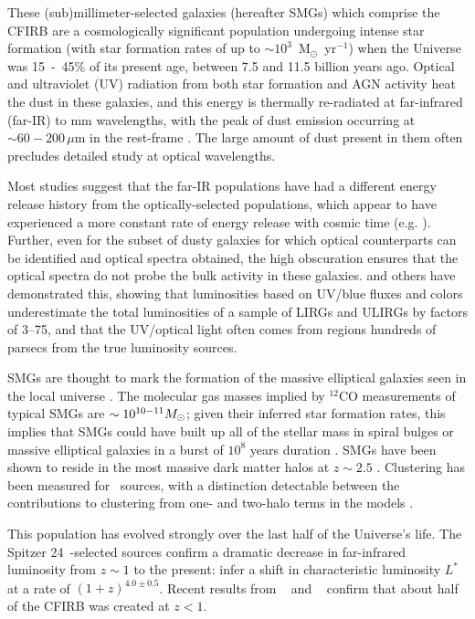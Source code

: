 These (sub)millimeter-selected galaxies (hereafter SMGs) which
comprise the CFIRB are a cosmologically significant population
undergoing intense star formation (with star formation rates of up to
$\sim10^3$~M$_{\odot}$~yr$^{-1}$) when the Universe was \mbox{15 -
45\%} of its present age, between 7.5 and 11.5 billion years
ago. Optical and ultraviolet (UV) radiation from both star formation
and AGN activity heat the dust in these galaxies, and this energy is
thermally re-radiated at far-infrared (far-IR) to mm wavelengths, with
the peak of dust emission occurring at $\sim60-200\,\mu$m in the
rest-frame \citep{soifer91}.  The large amount of dust present in them
often precludes detailed study at optical wavelengths.

Most studies suggest that the far-IR populations have had a different
energy release history from the optically-selected populations, which
appear to have experienced a more constant rate of energy release with
cosmic time (e.g. \citet{hopkins07}).  Further, even for the subset of
dusty galaxies for which optical counterparts can be identified and
optical spectra obtained, the high obscuration ensures that the
optical spectra do not probe the bulk activity in these
galaxies. \citet{goldader02} and others have demonstrated this,
showing that luminosities based on UV/blue fluxes and colors
underestimate the total luminosities of a sample of LIRGs and ULIRGs
by factors of 3--75, and that the UV/optical light often comes from
regions hundreds of parsecs from the true luminosity sources.

SMGs are thought to mark the formation of the massive elliptical
galaxies seen in the local universe \citep{swinbank08}. The molecular
gas masses implied by $^{12}$CO measurements of typical SMGs are
$\sim10^{10-11} M_{\odot}$; given their inferred star formation
rates, this implies that SMGs could have built up all of the stellar
mass in spiral bulges or massive elliptical galaxies in a burst of
$10^8$ years duration \citep{smail02,swinbank04}.  SMGs have been
shown to reside in the most massive dark matter halos at $z\sim2.5$
\citep{blain04,amblard11}.  Clustering has been measured for
\herschel\ sources, with a distinction detectable between the
contributions to clustering from one- and two-halo terms in the models
.%

This population has evolved strongly over the last half of the
Universe's life.  The Spitzer 24~\mm-selected sources confirm a
dramatic decrease in far-infrared luminosity from $z\sim1$ to the
present: \citet{lefloch05} infer a shift in characteristic luminosity
$L^*$ at a rate of $(1+z)^{4.0\pm0.5}$.  Recent results from \blast\
 and \herschel\ \citep{bethermin12} confirm that about
half of the CFIRB was created at $z<1$.

